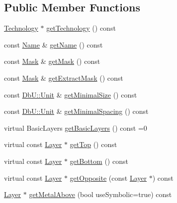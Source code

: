 \subsection*{Public Member Functions}
\begin{DoxyCompactItemize}
\item 
\hyperlink{classHurricane_1_1Technology}{Technology} $\ast$ \hyperlink{classHurricane_1_1Layer_a97a887987a73b0418b570e5bc88e5f3c}{get\-Technology} () const 
\item 
const \hyperlink{classHurricane_1_1Name}{Name} \& \hyperlink{classHurricane_1_1Layer_a3625264cf1cd8ca8ba8220441fc7e067}{get\-Name} () const 
\item 
const \hyperlink{classHurricane_1_1Layer_af5277c670637bd5d910237e7afe01a91}{Mask} \& \hyperlink{classHurricane_1_1Layer_a66f1406c35aa9e8612be3d4569b04ea8}{get\-Mask} () const 
\item 
const \hyperlink{classHurricane_1_1Layer_af5277c670637bd5d910237e7afe01a91}{Mask} \& \hyperlink{classHurricane_1_1Layer_ada0dd131c00c819ef97a2d867f1fad42}{get\-Extract\-Mask} () const 
\item 
const \hyperlink{group__DbUGroup_ga4fbfa3e8c89347af76c9628ea06c4146}{Db\-U\-::\-Unit} \& \hyperlink{classHurricane_1_1Layer_a6842d73f6157820dccae9af8a9464829}{get\-Minimal\-Size} () const 
\item 
const \hyperlink{group__DbUGroup_ga4fbfa3e8c89347af76c9628ea06c4146}{Db\-U\-::\-Unit} \& \hyperlink{classHurricane_1_1Layer_aeb887ad6f80db415b79f9885dd43d250}{get\-Minimal\-Spacing} () const 
\item 
virtual Basic\-Layers \hyperlink{classHurricane_1_1Layer_a7e953c126a02952e3a0b0d32f37e2ae0}{get\-Basic\-Layers} () const =0
\item 
virtual const \hyperlink{classHurricane_1_1Layer}{Layer} $\ast$ \hyperlink{classHurricane_1_1Layer_a00213c29884bfd396576c9cf2fb8ed59}{get\-Top} () const 
\item 
virtual const \hyperlink{classHurricane_1_1Layer}{Layer} $\ast$ \hyperlink{classHurricane_1_1Layer_a5398b082b8a441c13d5b54c3cefff685}{get\-Bottom} () const 
\item 
virtual const \hyperlink{classHurricane_1_1Layer}{Layer} $\ast$ \hyperlink{classHurricane_1_1Layer_a97d8901ab1e4598d0783aeb89f55421a}{get\-Opposite} (const \hyperlink{classHurricane_1_1Layer}{Layer} $\ast$) const 
\item 
\hyperlink{classHurricane_1_1Layer}{Layer} $\ast$ \hyperlink{classHurricane_1_1Layer_a6036194da9abccc65ff5fa701020b31e}{get\-Metal\-Above} (bool use\-Symbolic=true) const 

\end{DoxyCompactItemize}
